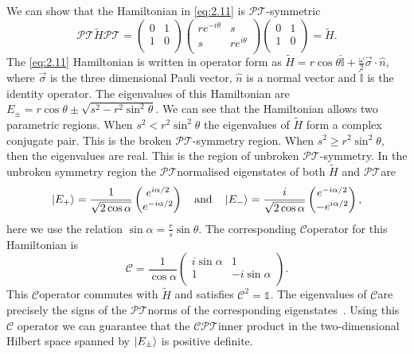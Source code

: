 \documentclass[12pt, a4paper]{report}
\newcommand\PT{\(\mathcal{PT}\)}
\newcommand\CC{\(\mathcal{C}\)}
\begin{document}
We can show that the Hamiltonian in \ref{eq:2.11} is \PT-symmetric
\begin{equation*}
\mathcal{PT}\tilde{H}\mathcal{PT} =\begin{pmatrix}
0 & 1  \\
1 & 0 \\
\end{pmatrix}
\begin{pmatrix}
re^{-i\theta} & s  \\
s & re^{i\theta} \\
\end{pmatrix}
\begin{pmatrix}
0 & 1  \\
1 & 0 \\
\end{pmatrix} = \tilde{H}.
\end{equation*}
The \ref{eq:2.11} Hamiltonian is written in operator form as $\tilde{H} = r\cos\theta \hat{\mathbb{I}} + \frac{\omega}{2} \vec{\sigma}\cdot\hat{n}$, where $\vec{\sigma}$ is the three dimensional Pauli vector, $\hat{n}$ is a normal vector and $\hat{\mathbb{I}}$ is the identity operator. The eigenvalues of this Hamiltonian are $E_{\pm} = r\cos\theta \pm \sqrt{s^2 - r^2\sin^2\theta}$. We can see that the Hamiltonian allows two parametric regions. When $s^2 < r^2\sin^2\theta$ the eigenvalues of $\tilde{H}$ form a complex conjugate pair. This is the broken \PT-symmetry region. When $s^2 \geq r^2\sin^2\theta$, then the eigenvalues are real. This is the region of unbroken \PT-symmetry. In the unbroken symmetry region the \PT\:normalised eigenstates of both $\tilde{H}$ and \PT\:are
\begin{equation}\label{eq:2.13}
\ket{E_{+}} = \frac{1}{\sqrt{2\cos\alpha}}\begin{pmatrix}
e^{i\alpha/2} \\
e^{-i\alpha/2} \\
\end{pmatrix}\quad\mathrm{and}\quad\ket{E_{-}} = \frac{i}{\sqrt{2\cos\alpha}}\begin{pmatrix}
e^{-i\alpha/2} \\
-e^{i\alpha/2} \\
\end{pmatrix},
\end{equation}
here we use the relation $\sin\alpha = \frac{r}{s}\sin\theta$. The corresponding \CC\:operator for this Hamiltonian is 
\begin{equation}\label{eq:2.14}
\mathcal{C} = \frac{1}{\cos\alpha}\begin{pmatrix}
i\sin\alpha & 1 \\
1 & -i\sin\alpha\\
\end{pmatrix}.
\end{equation}
This \CC\:operator commutes with $\tilde{H}$ and satisfies $\mathcal{C}^2= \mathds{1}$. The eigenvalues of \CC\:are precisely the signs of the \PT\:norms of the corresponding eigenstates~\cite{Bender_2004}. Using this \CC\: operator we can guarantee that the \CC\PT\:inner product in the two-dimensional Hilbert space spanned by $\ket{E_{\pm}}$ is positive definite.
\end{document}
